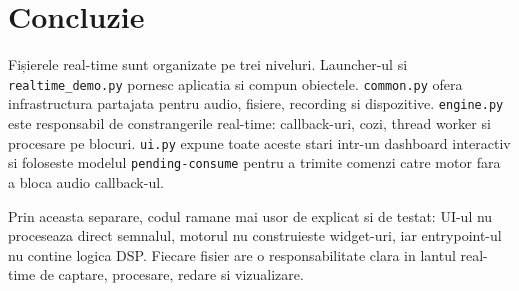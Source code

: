 \documentclass[12pt,a4paper]{report}
\begin{document}
\chapter{Concluzie}

Fișierele real-time sunt organizate pe trei niveluri. Launcher-ul si
\texttt{realtime\_demo.py} pornesc aplicatia si compun obiectele. \texttt{common.py}
ofera infrastructura partajata pentru audio, fisiere, recording si dispozitive.
\texttt{engine.py} este responsabil de constrangerile real-time: callback-uri,
cozi, thread worker si procesare pe blocuri. \texttt{ui.py} expune toate aceste
stari intr-un dashboard interactiv si foloseste modelul \texttt{pending-consume}
pentru a trimite comenzi catre motor fara a bloca audio callback-ul.

Prin aceasta separare, codul ramane mai usor de explicat si de testat: UI-ul nu
proceseaza direct semnalul, motorul nu construieste widget-uri, iar entrypoint-ul
nu contine logica DSP. Fiecare fisier are o responsabilitate clara in lantul
real-time de captare, procesare, redare si vizualizare.
\end{document}
